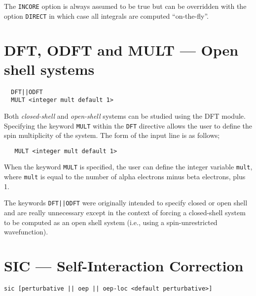 The \verb+INCORE+ option is always assumed to be true but can be
overridden with the option \verb+DIRECT+ in which case all integrals
are computed ``on-the-fly''.

\fussy

\section{DFT,  ODFT and  MULT --- Open shell systems}
\begin{verbatim}
  DFT||ODFT
  MULT <integer mult default 1>
\end{verbatim}

Both {\sl closed-shell} and {\sl open-shell} systems can be studied using
the DFT module.  Specifying the keyword \verb+MULT+ within the \verb+DFT+
directive allows the user to define the spin multiplicity of the system.
The form of the input line is as follows;
\begin{verbatim}
   MULT <integer mult default 1> 
\end{verbatim}
When the keyword \verb+MULT+ is specified, the user can define the integer
variable \verb+mult+, where \verb+mult+ is equal to the number of alpha 
electrons minus beta electrons, plus 1.

The keywords \verb+DFT||ODFT+ were originally intended to specify
closed or open shell and are really unnecessary except in the context
of forcing a closed-shell system to be computed as an open shell
system (i.e., using a spin-unrestricted wavefunction).
\section{SIC --- Self-Interaction Correction}

\begin{verbatim}
sic [perturbative || oep || oep-loc <default perturbative>]
\end{verbatim}

